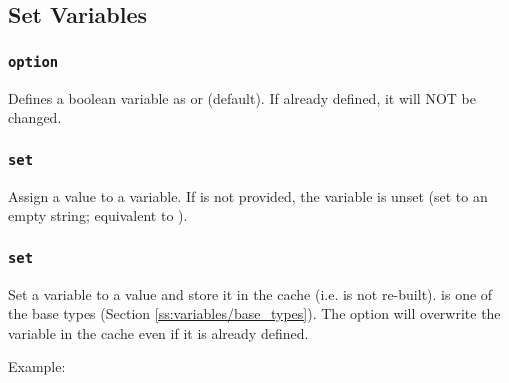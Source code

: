 \subsection{Set Variables}

\subsubsection{\texttt{option}}
\begin{center}  \end{center}
Defines a boolean variable as  or  (default). If already defined, it will NOT be changed.

\subsubsection{\texttt{set}}
\begin{center}  \end{center}
Assign a value to a variable. If  is not provided, the variable is unset (set to an empty string; equivalent to ).

\subsubsection{\texttt{set}}
\begin{center}  \end{center}
Set a variable to a value and store it in the cache (i.e. is not re-built).  is one of the base types (Section \ref{ss:variables/base_types}). The  option will overwrite the variable in the cache even if it is already defined.

Example: 





